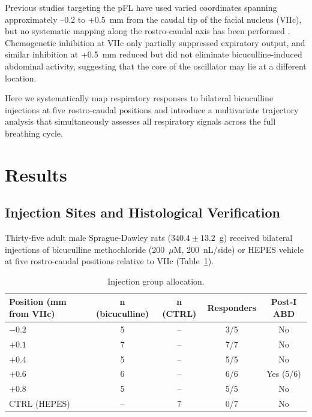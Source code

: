 \documentclass[11pt]{article}
\begin{document}
Previous studies targeting the pFL have used varied coordinates spanning approximately --0.2 to +0.5~mm from the caudal tip of the facial nucleus (VIIc), but no systematic mapping along the rostro-caudal axis has been performed \citep{huckstepp2015role, huckstepp2018chemogenetic, pisanski2020parafacial}. Chemogenetic inhibition at VIIc only partially suppressed expiratory output, and similar inhibition at +0.5~mm reduced but did not eliminate bicuculline-induced abdominal activity, suggesting that the core of the oscillator may lie at a different location.

Here we systematically map respiratory responses to bilateral bicuculline injections at five rostro-caudal positions and introduce a multivariate trajectory analysis that simultaneously assesses all respiratory signals across the full breathing cycle.

\section{Results}

\subsection{Injection Sites and Histological Verification}

Thirty-five adult male Sprague-Dawley rats ($340.4 \pm 13.2$~g) received bilateral injections of bicuculline methochloride (200~$\mu$M, 200~nL/side) or HEPES vehicle at five rostro-caudal positions relative to VIIc (Table~\ref{tab:groups}).

\begin{table}[H]
\centering
\caption{Injection group allocation.}
\label{tab:groups}
\begin{tabular}{lcccc}
\toprule
\textbf{Position (mm from VIIc)} & \textbf{n (bicuculline)} & \textbf{n (CTRL)} & \textbf{Responders} & \textbf{Post-I ABD} \\
\midrule
$-0.2$ & 5 & -- & 3/5 & No \\
$+0.1$ & 7 & -- & 7/7 & No \\
$+0.4$ & 5 & -- & 5/5 & No \\
$+0.6$ & 6 & -- & 6/6 & Yes (5/6) \\
$+0.8$ & 5 & -- & 5/5 & No \\
CTRL (HEPES) & -- & 7 & 0/7 & No \\
\bottomrule
\end{tabular}
\end{table}
\end{document}
